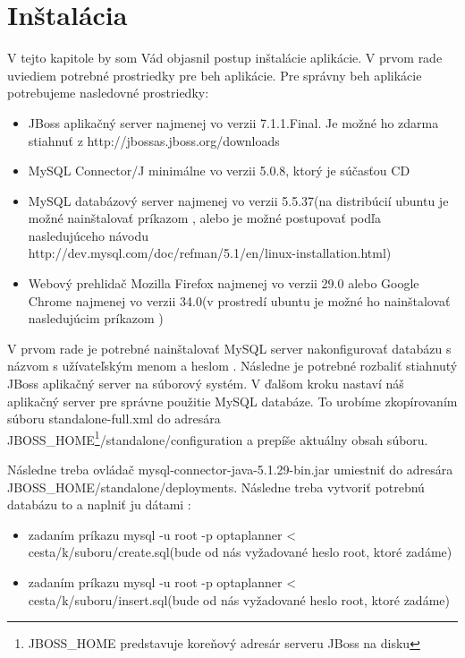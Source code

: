 \chapter{Inštalácia}
{
	V tejto kapitole by som Vád objasnil postup inštalácie aplikácie. V prvom rade uviediem potrebné prostriedky pre beh aplikácie. Pre správny beh aplikácie potrebujeme nasledovné prostriedky:
	\begin{itemize}
	\item JBoss aplikačný server najmenej vo verzii 7.1.1.Final. Je možné ho zdarma stiahnuť z http://jbossas.jboss.org/downloads
	\item MySQL Connector/J minimálne vo verzii 5.0.8, ktorý je súčasťou CD
	\item MySQL databázový server najmenej vo verzii 5.5.37(na distribúcií ubuntu je možné nainštalovať príkazom , alebo je možné postupovať podľa nasledujúceho návodu  \\http://dev.mysql.com/doc/refman/5.1/en/linux-installation.html)
	\item Webový prehlidač Mozilla Firefox najmenej vo verzii 29.0 alebo Google Chrome najmenej vo verzii 34.0(v prostredí ubuntu je možné ho nainštalovať nasledujúcim príkazom )
	\end{itemize}
	V prvom rade je potrebné nainštalovať MySQL server nakonfigurovať databázu s názvom  s užívateľským menom  a heslom . Následne je potrebné rozbaliť stiahnutý JBoss aplikačný server na súborový systém. V ďalšom kroku nastaví náš aplikačný server pre správne použitie MySQL databáze.  To urobíme zkopírovaním súboru standalone-full.xml do adresára JBOSS\_HOME\footnote{JBOSS\_HOME predstavuje koreňový adresár serveru JBoss na disku}/standalone/configuration a prepíše aktuálny obsah súboru.

	Následne treba ovládač mysql-connector-java-5.1.29-bin.jar umiestniť do adresára \\ JBOSS\_HOME/standalone/deployments. Následne treba vytvoriť potrebnú databázu to a naplniť ju dátami :
	\begin{itemize}
	\item zadaním príkazu mysql -u root -p optaplanner < cesta/k/suboru/create.sql(bude od nás vyžadované heslo root, ktoré zadáme)
	\item zadaním príkazu mysql -u root -p optaplanner < cesta/k/suboru/insert.sql(bude od nás vyžadované heslo root, ktoré zadáme)
	\end{itemize}

}
